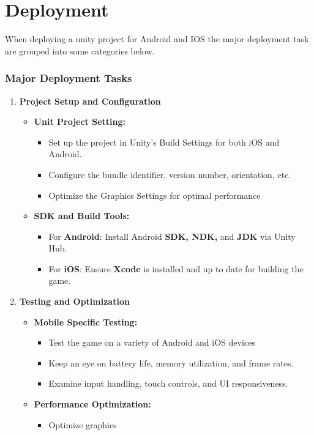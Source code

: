 \chapter{Deployment}
When deploying a unity project for Android and IOS the major deployment task are grouped into some categories below.
\subsection{Major Deployment Tasks}
\begin{enumerate}
	\item \textbf{Project Setup and Configuration}
	\begin{itemize}
		\item \textbf{Unit Project Setting:}
		\begin{itemize}
			\item {Set up the project in Unity's Build Settings for both iOS and Android.}
			\item {Configure the bundle identifier, version number, orientation, etc.}
			\item {Optimize the Graphics Settings for optimal performance}
		\end{itemize}
		\item \textbf{SDK and Build Tools:}
		\begin{itemize}
			\item {For \textbf{Android}: Install Android \textbf{SDK, NDK,} and \textbf{JDK} via Unity Hub.}
			\item {For \textbf{iOS}: Ensure\textbf{ Xcode} is installed and up to date for building the game.}
		\end{itemize}
	\end{itemize}
	\item \textbf{Testing and Optimization}
	\begin{itemize}
		\item \textbf{Mobile Specific Testing:}
		\begin{itemize}
			\item {Test the game on a variety of Android and iOS devices}
			\item {Keep an eye on battery life, memory utilization, and frame rates.}
			\item {Examine input handling, touch controls, and UI responsiveness.}
		\end{itemize}
		\item \textbf{Performance Optimization:}
		\begin{itemize}
			\item {Optimize graphics}

\end{itemize}
\end{itemize}
\end{enumerate}
